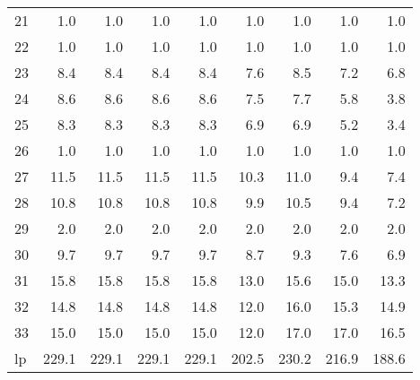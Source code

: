 \begin{tabular}{lrrrrrrrr}
     21 &   1.0 &   1.0 &   1.0 &   1.0 &   1.0 &   1.0 &   1.0 &   1.0 \\
     22 &   1.0 &   1.0 &   1.0 &   1.0 &   1.0 &   1.0 &   1.0 &   1.0 \\
     23 &   8.4 &   8.4 &   8.4 &   8.4 &   7.6 &   8.5 &   7.2 &   6.8 \\
     24 &   8.6 &   8.6 &   8.6 &   8.6 &   7.5 &   7.7 &   5.8 &   3.8 \\
     25 &   8.3 &   8.3 &   8.3 &   8.3 &   6.9 &   6.9 &   5.2 &   3.4 \\
     26 &   1.0 &   1.0 &   1.0 &   1.0 &   1.0 &   1.0 &   1.0 &   1.0 \\
     27 &  11.5 &  11.5 &  11.5 &  11.5 &  10.3 &  11.0 &   9.4 &   7.4 \\
     28 &  10.8 &  10.8 &  10.8 &  10.8 &   9.9 &  10.5 &   9.4 &   7.2 \\
     29 &   2.0 &   2.0 &   2.0 &   2.0 &   2.0 &   2.0 &   2.0 &   2.0 \\
     30 &   9.7 &   9.7 &   9.7 &   9.7 &   8.7 &   9.3 &   7.6 &   6.9 \\
     31 &  15.8 &  15.8 &  15.8 &  15.8 &  13.0 &  15.6 &  15.0 &  13.3 \\
     32 &  14.8 &  14.8 &  14.8 &  14.8 &  12.0 &  16.0 &  15.3 &  14.9 \\
     33 &  15.0 &  15.0 &  15.0 &  15.0 &  12.0 &  17.0 &  17.0 &  16.5 \\
     lp & 229.1 & 229.1 & 229.1 & 229.1 & 202.5 & 230.2 & 216.9 & 188.6 \\
\bottomrule
\end{tabular}

